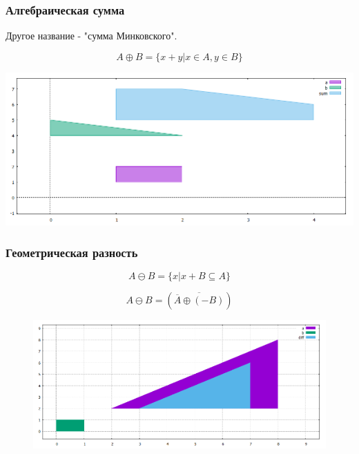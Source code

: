 \documentclass{beamer}
\begin{document}
  \begin{frame}
    \frametitle{Алгебраическая сумма}
    
    Другое название - "сумма Минковского". 
    
    \begin{equation}
      A \oplus B =  \{ x + y | x \in A, y \in B \} 
    \end{equation}

    \includegraphics[width=1.0\textwidth]{sum}
  
  \end{frame}
  
  
  \begin{frame}
    \frametitle{Геометрическая разность}
    
    \begin{equation}
      A \ominus B =  \{ x | x + B \subseteq A \} 
    \end{equation}

    \begin{equation}
        A \ominus B =
        (\overline{\overline{A} \oplus (- B)})
    \end{equation}  

    \begin{figure}
        \includegraphics[scale=0.4]{diff}
    \end{figure}

  \end{frame}
  
\end{document}
